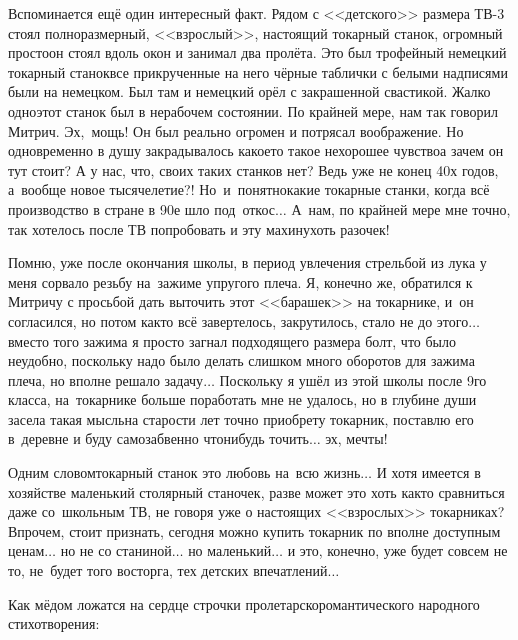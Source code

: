 Вспоминается ещё один интересный факт. Рядом с <<детского>> размера ТВ-3 стоял полноразмерный, <<взрослый>>, настоящий токарный станок, огромный просто\mdash он стоял вдоль окон и занимал два пролёта. Это был трофейный немецкий токарный станок\mdash все прикрученные на него чёрные таблички с белыми надписями были на немецком. Был там и немецкий орёл с закрашенной свастикой. Жалко одно\mdash этот станок был в нерабочем состоянии. По крайней мере, нам так говорил Митрич. Эх,~мощь! Он был реально огромен и потрясал воображение. Но одновременно в душу закрадывалось какое\sdash то такое нехорошее чувство\mdash а зачем он тут стоит? А у нас, что, своих таких станков нет? Ведь уже не конец 40\sdash х годов, а~вообще новое тысячелетие?! Но~и~понятно\mdash какие токарные станки, когда всё производство в стране в 90\sdash е шло под~откос$\ldots$ А~нам, по крайней мере мне точно, так хотелось после ТВ попробовать и эту махину\mdash хоть разочек! 

Помню, уже после окончания школы, в период увлечения стрельбой из лука у меня сорвало резьбу на~зажиме упругого плеча. Я, конечно же, обратился к Митричу с просьбой дать выточить этот <<барашек>> на токарнике, и~он согласился, но потом как\sdash то всё завертелось, закрутилось, стало не до этого$\ldots$ вместо того зажима я просто загнал подходящего размера болт, что было неудобно, поскольку надо было делать слишком много оборотов для зажима плеча, но вполне решало задачу$\ldots$ Поскольку я ушёл из этой школы после 9\sdash го класса, на~токарнике больше поработать мне не удалось, но в глубине души засела такая мысль\mdash на старости лет точно приобрету токарник, поставлю его в~деревне и буду самозабвенно что\sdash нибудь точить$\ldots$ эх, мечты!

Одним словом\mdash токарный станок это любовь на~всю жизнь$\ldots$ И хотя имеется в хозяйстве маленький столярный станочек, разве может это хоть как\sdash то сравниться даже со~школьным ТВ, не говоря уже о настоящих <<взрослых>> токарниках? Впрочем, стоит признать, сегодня можно купить токарник по вполне доступным ценам$\ldots$ но не со станиной$\ldots$ но маленький$\ldots$ и это, конечно, уже будет совсем не то, не~будет того восторга, тех детских впечатлений$\ldots$

Как мёдом ложатся на сердце строчки пролетарско\sdash романтического народного стихотворения:

